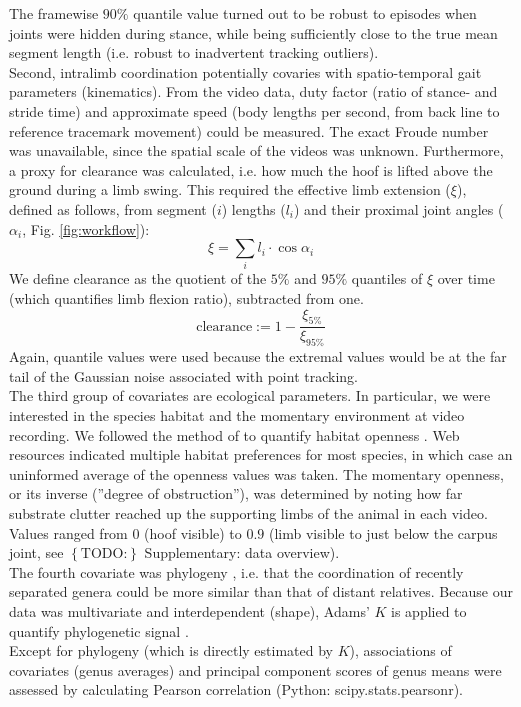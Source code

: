 \documentclass[10pt, a4paper]{article}
\newcommand{\todo}[1]{\colorbox{terracotta!30!yellow}{\footnotesize{$\left\lbrace\text{TODO:}\right\rbrace$ }#1\normalsize}}
\begin{document}
\begin{linenumbers}[1]
The framewise $90\%$ quantile value turned out to be robust to episodes when joints were hidden during stance, while being sufficiently close to the true mean segment length (i.e. robust to inadvertent tracking outliers). 
\\Second, intralimb coordination potentially covaries with spatio-temporal gait parameters (kinematics). 
From the video data, duty factor (ratio of stance- and stride time) and approximate speed (body lengths per second, from back line to reference tracemark movement) could be measured. 
The exact Froude number was unavailable, since the spatial scale of the videos was unknown. 
Furthermore, a proxy for clearance \citep[\textit{cf.}][]{Austin1999} was calculated, i.e. how much the hoof is lifted above the ground during a limb swing. 
This required the effective limb extension ($\xi$), defined as follows, from segment ($i$) lengths ($l_{i}$) and their proximal joint angles ($\alpha_{i}$, Fig. \ref{fig:workflow}):
$$\xi = \sum\limits_{i} l_{i} \cdot \cos{\alpha_{i}}$$
We define clearance as the quotient of the $5\%$ and $95\%$ quantiles of $\xi$ over time (which quantifies limb flexion ratio), subtracted from one. 
$$\text{clearance} := 1 - \frac{\xi_{5\%}}{\xi_{95\%}} $$
Again, quantile values were used because the extremal values would be at the far tail of the Gaussian noise associated with point tracking. 
\\The third group of covariates are ecological parameters. 
In particular, we were interested in the species habitat and the momentary environment at video recording. 
We followed the method of \citet{Stankowich2009} to quantify habitat openness \citep{Caro2004,Stankowich2009}. 
Web resources indicated multiple habitat preferences for most species, in which case an uninformed average of the openness values was taken. 
The momentary openness, or its inverse (''degree of obstruction''), was determined by noting how far substrate clutter reached up the supporting limbs of the animal in each video. 
Values ranged from $0$ (hoof visible) to $0.9$ (limb visible to just below the carpus joint, see \todo{Supplementary: data overview}). 
\\The fourth covariate was phylogeny \citep[Fig. \ref{fig:phylogeny};][]{Zurano2019}, i.e. that the coordination of recently separated genera could be more similar than that of distant relatives. 
Because our data was multivariate and interdependent (shape), Adams' $K$ is applied to quantify phylogenetic signal \citep{Adams2014}. 
\medskip\\Except for phylogeny (which is directly estimated by $K$), associations of covariates (genus averages) and principal component scores of genus means \citep{Mitteroecker2011} were assessed by calculating Pearson correlation (Python: \textsf{scipy.stats.pearsonr}). 

\end{linenumbers}
\end{document}
